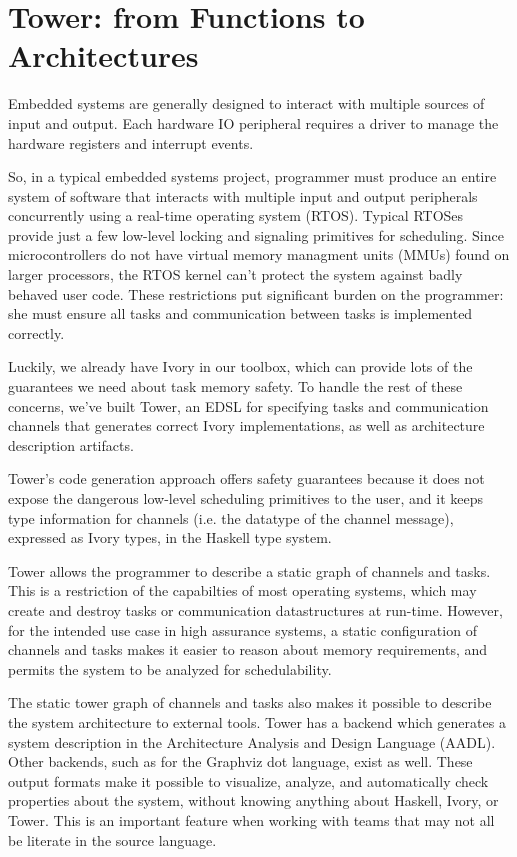 \section{Tower: from Functions to Architectures}
\label{sec:tower}


Embedded systems are generally designed to interact with multiple sources of
input and output. Each hardware IO peripheral requires a driver to manage the
hardware registers and interrupt events.

So, in a typical embedded systems project, programmer must produce an entire
system of software that interacts with multiple input and output peripherals
concurrently using a real-time operating system (RTOS). Typical RTOSes provide
just a few low-level locking and signaling primitives for scheduling. Since
microcontrollers do not have virtual memory managment units (MMUs) found on
larger processors, the RTOS kernel can't protect the system against badly
behaved user code. These restrictions put significant burden on the programmer:
she must ensure all tasks and communication between tasks is implemented
correctly.

Luckily, we already have Ivory in our toolbox, which can provide lots of
the guarantees we need about task memory safety. To handle the rest of these
concerns, we've built Tower, an EDSL for specifying tasks and communication
channels that generates correct Ivory implementations, as well as architecture
description artifacts.

Tower's code generation approach offers safety guarantees because it does not
expose the dangerous low-level scheduling primitives to the user, and it keeps
type information for channels (i.e. the datatype of the channel message),
expressed as Ivory types, in the Haskell type system.

Tower allows the programmer to describe a static graph of channels and tasks.
This is a restriction of the capabilties of most operating systems, which may
create and destroy tasks or communication datastructures at run-time. However,
for the intended use case in high assurance systems, a static configuration of
channels and tasks makes it easier to reason about memory requirements, and
permits the system to be analyzed for schedulability.

The static tower graph of channels and tasks also makes it possible to
describe the system architecture to external tools. Tower has a backend which
generates a system description in the Architecture Analysis and Design Language
(AADL). Other backends, such as for the Graphviz dot language, exist as well.
These output formats make it possible to visualize, analyze, and automatically
check properties about the system, without knowing anything about Haskell,
Ivory, or Tower. This is an important feature when working with teams that may
not all be literate in the source language.

